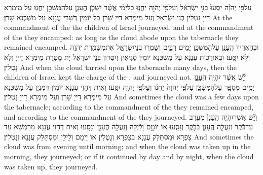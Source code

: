 {עַל\maqqaf פִּ֣י יְהֹוָ֗ה יִסְעוּ֙ בְּנֵ֣י יִשְׂרָאֵ֔ל וְעַל\maqqaf פִּ֥י יְהֹוָ֖ה יַחֲנ֑וּ כׇּל\maqqaf יְמֵ֗י אֲשֶׁ֨ר יִשְׁכֹּ֧ן הֶעָנָ֛ן עַל\maqqaf הַמִּשְׁכָּ֖ן יַחֲנֽוּ׃}
{עַל מֵימְרָא דַּייָ נָטְלִין בְּנֵי יִשְׂרָאֵל וְעַל מֵימְרָא דַּייָ שָׁרַן כָּל יוֹמִין דְּשָׁרֵי עֲנָנָא עַל מַשְׁכְּנָא שָׁרַן׃}
{At the commandment of the \lord\space the children of Israel journeyed, and at the commandment of the \lord\space they encamped: as long as the cloud abode upon the tabernacle they remained encamped.}{}
{וּבְהַאֲרִ֧יךְ הֶֽעָנָ֛ן עַל\maqqaf הַמִּשְׁכָּ֖ן יָמִ֣ים רַבִּ֑ים וְשָׁמְר֧וּ בְנֵי\maqqaf יִשְׂרָאֵ֛ל אֶת\maqqaf מִשְׁמֶ֥רֶת יְהֹוָ֖ה וְלֹ֥א יִסָּֽעוּ׃}
{וּבְאוֹרָכוּת עֲנָנָא עַל מַשְׁכְּנָא יוֹמִין סַגִּיאִין וְיִטְּרוּן בְּנֵי יִשְׂרָאֵל יָת מַטְּרַת מֵימְרָא דַּייָ וְלָא נָטְלִין׃}
{And when the cloud tarried upon the tabernacle many days, then the children of Israel kept the charge of the \lord, and journeyed not.}{}
{וְיֵ֞שׁ אֲשֶׁ֨ר יִהְיֶ֧ה הֶֽעָנָ֛ן יָמִ֥ים מִסְפָּ֖ר עַל\maqqaf הַמִּשְׁכָּ֑ן עַל\maqqaf פִּ֤י יְהֹוָה֙ יַחֲנ֔וּ וְעַל\maqqaf פִּ֥י יְהֹוָ֖ה יִסָּֽעוּ׃}
{וְאִית דְּהָוֵי עֲנָנָא יוֹמִין דְּמִנְיָן עַל מַשְׁכְּנָא עַל מֵימְרָא דַּייָ שָׁרַן וְעַל מֵימְרָא דַּייָ נָטְלִין׃}
{And sometimes the cloud was a few days upon the tabernacle; according to the commandment of the \lord\space they remained encamped, and according to the commandment of the \lord\space they journeyed.}{}
{וְיֵ֞שׁ אֲשֶׁר\maqqaf יִהְיֶ֤ה הֶֽעָנָן֙ מֵעֶ֣רֶב עַד\maqqaf בֹּ֔קֶר וְנַעֲלָ֧ה הֶֽעָנָ֛ן בַּבֹּ֖קֶר וְנָסָ֑עוּ א֚וֹ יוֹמָ֣ם וָלַ֔יְלָה וְנַעֲלָ֥ה הֶעָנָ֖ן וְנָסָֽעוּ׃}
{וְאִית דְּהָוֵי עֲנָנָא מֵרַמְשָׁא עַד צַפְרָא וּמִסְתַּלַּק עֲנָנָא בְּצַפְרָא וְנָטְלִין אוֹ יֵימָם וְלֵילֵי וּמִסְתַּלַּק עֲנָנָא וְנָטְלִין׃}
{And sometimes the cloud was from evening until morning; and when the cloud was taken up in the morning, they journeyed; or if it continued by day and by night, when the cloud was taken up, they journeyed.}{}
